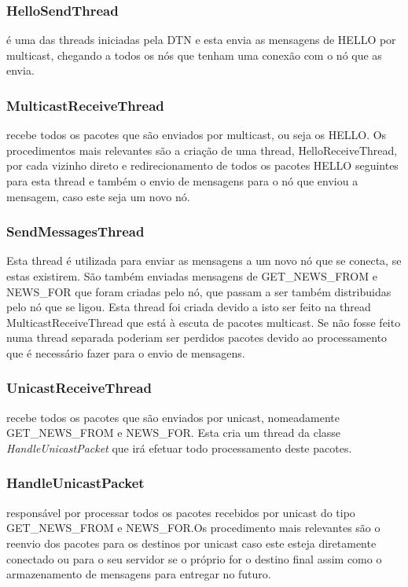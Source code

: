 \documentclass{llncs}
\begin{document}
\subsubsection{HelloSendThread} é uma das threads iniciadas pela DTN e esta envia as mensagens de HELLO por multicast, chegando a todos os nós que tenham uma conexão com o nó que as envia.

\subsubsection{MulticastReceiveThread} recebe todos os pacotes que são enviados por multicast, ou seja os HELLO. Os procedimentos mais relevantes são a criação de uma thread, HelloReceiveThread, por cada vizinho direto e redirecionamento de todos os pacotes HELLO seguintes para esta thread e também o envio de mensagens para o nó que enviou a mensagem, caso este seja um novo nó.

\subsubsection{SendMessagesThread} Esta thread é utilizada para enviar as mensagens a um novo nó que se conecta, se estas existirem. São também enviadas mensagens de GET\_NEWS\_FROM e NEWS\_FOR que foram criadas pelo nó, que passam a ser também distribuidas pelo nó que se ligou. Esta thread foi criada devido a isto ser feito na thread MulticastReceiveThread que está à escuta de pacotes multicast. Se não fosse feito numa thread separada poderiam ser perdidos pacotes devido ao processamento que é necessário fazer para o envio de mensagens.

\subsubsection{UnicastReceiveThread} recebe todos os pacotes que são enviados por unicast, nomeadamente GET\_NEWS\_FROM e NEWS\_FOR. Esta cria um thread da classe \emph{HandleUnicastPacket} que irá efetuar todo processamento deste pacotes.

\subsubsection{HandleUnicastPacket} responsável por processar todos os pacotes recebidos por unicast do tipo GET\_NEWS\_FROM e NEWS\_FOR.Os procedimento mais relevantes são o reenvio dos pacotes para os destinos por unicast caso este esteja diretamente conectado ou para o seu servidor se o próprio for o destino final assim como o armazenamento de mensagens para entregar no futuro.
\end{document}
